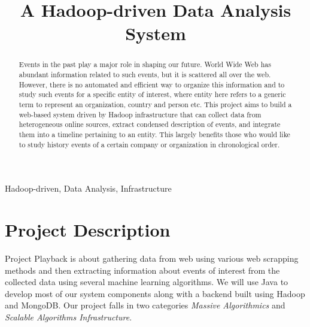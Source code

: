 \documentclass[10pt,conference]{IEEEtran}
\begin{document}
\title{A Hadoop-driven Data Analysis System}

\author{%
\and
{}
\and
{}
}

\maketitle

\begin{abstract}
\textnormal{%
Events in the past play a major role in shaping our future. World Wide Web has
abundant information related to such events, but it is scattered all over the
web. However, there is no automated and efficient way to organize this
information and to study such events for a specific entity of interest, where
entity here refers to a generic term to represent an organization, country and
person etc. This project aims to build a web-based system driven by Hadoop
infrastructure that can collect data from heterogeneous online sources, extract
condensed description of events, and integrate them into a timeline pertaining
to an entity. This largely benefits those who would like to study history
events of a certain company or organization in chronological order.
}
\end{abstract}

\begin{IEEEkeywords}
  \textnormal{Hadoop-driven, Data Analysis, Infrastructure}
\end{IEEEkeywords}

\IEEEpeerreviewmaketitle

\section{Project Description}\label{sec:project-description}

Project Playback is about gathering data from web using various web scrapping
methods and then extracting information about events of interest from the
collected data using several machine learning algorithms. We will use Java
to develop most of our system components along with a backend built using
Hadoop and MongoDB. Our project falls in two categories \textit{Massive
Algorithmics} and \textit{Scalable Algorithms Infrastructure}.
\end{document}
